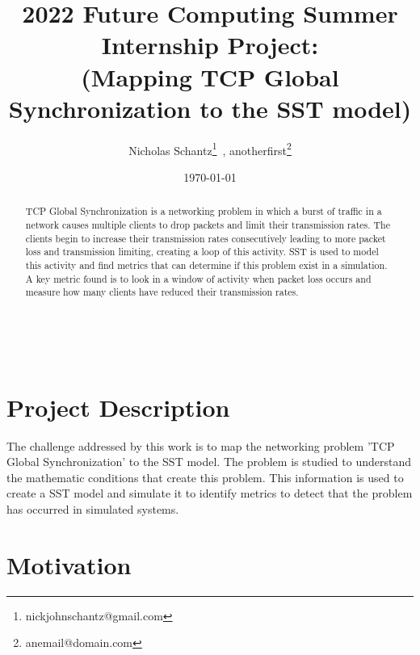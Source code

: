 \documentclass{article}
\begin{document}
    \begin{minipage}[h]{\textwidth}
        \title{2022 Future Computing Summer Internship Project:\\(Mapping TCP Global Synchronization to the SST model)}
        \author{Nicholas Schantz\footnote{nickjohnschantz@gmail.com}\ , 
        anotherfirst\footnote{anemail@domain.com}}
        \date{\today}
            \maketitle
        \begin{abstract}
            TCP Global Synchronization is a networking problem in which a burst of traffic in a network causes multiple clients to drop packets and limit their transmission rates. The clients begin to increase their transmission rates consecutively leading to more packet loss and transmission limiting, creating a loop of this activity. SST is used to model this activity and find metrics that can determine if this problem exist in a simulation. A key metric found is to look in a window of activity when packet loss occurs and measure how many clients have reduced their transmission rates.
        \end{abstract}
    \end{minipage}

\ \\



\section{Project Description} %

The challenge addressed by this work is to map the networking problem 'TCP Global Synchronization' to the SST model. The problem is studied to understand the mathematic conditions that create this problem. This information is used to create a SST model and simulate it to identify metrics to detect that the problem has occurred in simulated systems.

\section{Motivation} %
\end{document}
